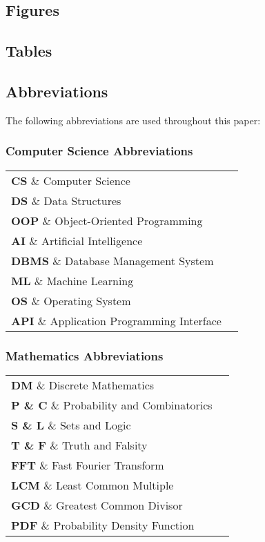 \subsection{Figures} \listoffigures %

\subsection{Tables} \listoftables %

\subsection{Abbreviations}

The following abbreviations are used throughout this paper:

\subsubsection{Computer Science Abbreviations}

\begin{tabular}{ll}
    \textbf{CS} \& Computer Science \\
    \textbf{DS} \& Data Structures \\
    \textbf{OOP} \& Object-Oriented Programming \\
    \textbf{AI} \& Artificial Intelligence \\
    \textbf{DBMS} \& Database Management System \\
    \textbf{ML} \& Machine Learning \\
    \textbf{OS} \& Operating System \\
    \textbf{API} \& Application Programming Interface \\
\end{tabular}

\subsubsection{Mathematics Abbreviations}

\begin{tabular}{ll}
    \textbf{DM} \& Discrete Mathematics \\
    \textbf{P \& C} \& Probability and Combinatorics \\
    \textbf{S \& L} \& Sets and Logic \\
    \textbf{T \& F} \& Truth and Falsity \\
    \textbf{FFT} \& Fast Fourier Transform \\
    \textbf{LCM} \& Least Common Multiple \\
    \textbf{GCD} \& Greatest Common Divisor \\
    \textbf{PDF} \& Probability Density Function \\
\end{tabular}

